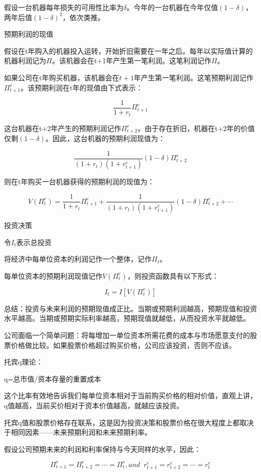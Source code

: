 \documentclass{article}
\begin{document}
假设一台机器每年损失的可用性比率为$ \delta $。今年的一台机器在今年仅值$ (1-\delta) $，两年后值$ (1-\delta)^2 $，依次类推。

预期利润的现值

假设在t年购入的机器投入运转，开始折旧需要在一年之后。每年以实际值计算的机器利润记为$ \Pi $。该机器会在t+1年产生第一笔利润。这笔利润记作$ \Pi $。

如果公司在t年购买机器，该机器会在$ t+1 $年产生第一笔利润。这笔预期利润记作$ \Pi^e_{t+1} $。该预期利润在t年的现值由下式表示：

\[
\frac{1}{1+r_t}\Pi^e_{t+1}
\]

这台机器在t+2年产生的预期利润记作$ \Pi^e_{t+2} $。由于存在折旧，机器在t+2年的价值仅剩$ (1-\delta) $。因此，这台机器的预期利润现值为：

\[
\frac{1}{(1+r_t)(1+r^e_{t+1})}(1-\delta)\Pi^e_{t+2}
\]

则在t年购买一台机器获得的预期利润的现值为：

\[
V(\Pi^e_t)=\frac{1}{1+r_t}\Pi^e_{t+1}+\frac{1}{(1+r_t)(1+r^e_{t+1})}(1-\delta)\Pi^e_{t+2}+\cdots
\]

投资决策

令$ I_t $表示总投资

将经济中每单位资本的利润记作一个整体，记作$ \Pi_t $。

每单位资本的预期利润现值记作$ V(\Pi^e_t) $，则投资函数具有以下形式：

\[
I_t=I[V(\Pi^e_t)]
\]

总结：投资与未来利润的预期现值成正比。当期或预期利润越高，预期现值和投资水平越高。当期或预期实际利率越高，预期现值就越低，从而投资水平就越低。

公司面临一个简单问题：将每增加一单位资本所需花费的成本与市场愿意支付的股票价格做比较。如果股票价格超过购买价格，公司应该投资，否则不应该。

托宾q理论：

q=总市值/资本存量的重置成本

这个比率有效地告诉我们每单位资本相对于当前购买价格的相对价值，直观上讲，q值越高，当前买价相对于资本价值越高，就越应该投资。

托宾q值和股票价格存在联系，这是因为投资决策和股票价格在很大程度上都取决于相同因素——未来预期利润和未来预期利率。

\hspace*{\fill}

假设公司预期未来的利润和利率保持与今天同样的水平，因此：

\[
\Pi^e_{t+1}=\Pi^e_{t+2}=\cdots=\Pi^e_{t},and\enspace r^e_{t+1}=r^e_{t+2}=\cdots=r^e_{t}
\]
\end{document}
